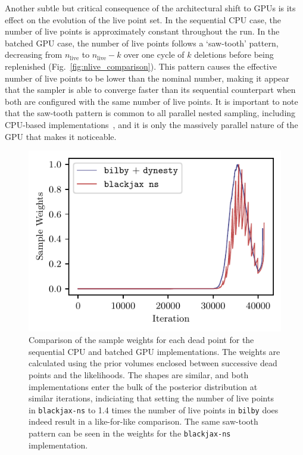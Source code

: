 \documentclass[fleqn,usenatbib]{mnras}
\begin{document}
Another subtle but critical consequence of the architectural shift to GPUs is
its effect on the evolution of the live point set. In the sequential
CPU case, the number of live points is approximately constant throughout the run. In the
batched GPU case, the number of live points follows a `saw-tooth'
pattern, decreasing from $n_{\text{live}}$ to
\mbox{$n_{\text{live}} - k$} over one cycle of $k$ deletions before being replenished (Fig.~\ref{fig:nlive_comparison}). This pattern
causes the effective number of live points to be lower than the nominal number,
making it appear that the sampler is able to converge faster than its sequential counterpart
when both are configured with the same number of live points. It is important to 
note that the saw-tooth pattern is common to all
parallel nested sampling, including CPU-based implementations~\cite{Handley:2015vkr},
and it is only the massively parallel nature of the GPU that makes it noticeable.

\begin{figure}
    \centering
    \includegraphics{figures/weights_comparison.pdf}
    \caption{Comparison of the sample weights for each dead point for the sequential CPU and batched GPU implementations.
    The weights are calculated using the prior volumes enclosed between successive dead points and the likelihoods. 
    The shapes are similar, and both implementations enter the bulk of the posterior distribution at similar iterations,
    indiciating that setting the number of live points in \texttt{blackjax-ns} to 1.4 times the number of live points in \texttt{bilby} 
    does indeed result in a like-for-like comparison. The same saw-tooth pattern can be 
    seen in the weights for the \texttt{blackjax-ns} implementation.}
    \label{fig:weights_comparison}
\end{figure}
\end{document}
